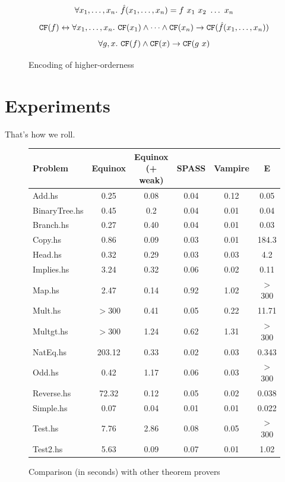 \documentclass[preprint]{sigplanconf}
\begin{document}
\begin{figure}
$$ \forall x_1,\dots,x_n.~\hat{f}(x_1,\dots,x_n) = f~x_1~x_2~\dots~x_n$$
$$ \texttt{CF}(f) \leftrightarrow \forall x_1,\dots,x_n.~\texttt{CF}(x_1) \land \dots \land \texttt{CF}(x_n) \to \texttt{CF}(\hat{f}(x_1,\dots,x_n))$$
$$\forall g,x.~\texttt{CF}(f) \land \texttt{CF}(x) \to \texttt{CF}(g~x)$$
\caption{Encoding of higher-orderness}
\label{ho-fig}
\end{figure}

\section{Experiments}
That's how we roll.

\begin{figure}
\begin{center}
    \begin{tabular}{l|c|c|c|c|c}
      Problem & Equinox & Equinox (+ weak) & SPASS & Vampire & E \\
      \hline
      Add.hs & 0.25 & 0.08 & 0.04 & 0.12 & 0.05\\
      BinaryTree.hs & 0.45 & 0.2 & 0.04 & 0.01 & 0.04 \\
      Branch.hs & 0.27 & 0.40 & 0.04 & 0.01 & 0.03 \\
      Copy.hs & 0.86 & 0.09 & 0.03 & 0.01 & 184.3 \\
      Head.hs & 0.32 & 0.29 & 0.03 & 0.03 & 4.2 \\
      Implies.hs & 3.24 & 0.32 & 0.06 & 0.02 & 0.11 \\
      Map.hs & 2.47 & 0.14 & 0.92 & 1.02 & $>$300 \\
      Mult.hs & $>$300 & 0.41 & 0.05 & 0.22 & 11.71 \\
      Multgt.hs & $>$300 & 1.24 & 0.62 & 1.31 & $>$300 \\
      NatEq.hs & 203.12 & 0.33 & 0.02 & 0.03 & 0.343 \\
      Odd.hs & 0.42 & 1.17 & 0.06 & 0.03 & $>$300 \\
      Reverse.hs & 72.32 & 0.12 & 0.05 & 0.02 & 0.038 \\
      Simple.hs & 0.07 & 0.04 & 0.01 & 0.01 & 0.022 \\
      Test.hs & 7.76 & 2.86 & 0.08 & 0.05 & $>$300 \\
      Test2.hs & 5.63 & 0.09 & 0.07 & 0.01 & 1.02 \\
    \end{tabular}
\end{center}
\caption{Comparison (in seconds) with other theorem provers}
\label{comparison}
\end{figure}
\end{document}
